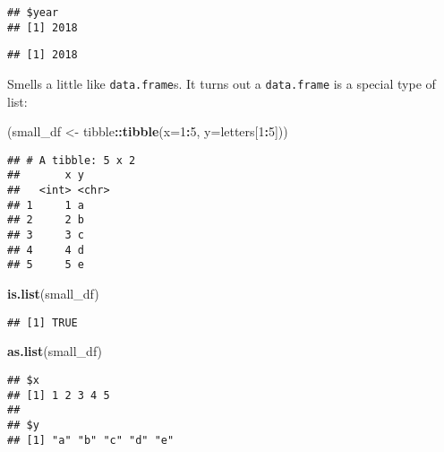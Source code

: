 \documentclass[]{article}
\newenvironment{Shaded}{\begin{snugshade}}{\end{snugshade}}
\newcommand{\KeywordTok}[1]{\textcolor[rgb]{0.13,0.29,0.53}{\textbf{#1}}}
\newcommand{\DataTypeTok}[1]{\textcolor[rgb]{0.13,0.29,0.53}{#1}}
\newcommand{\DecValTok}[1]{\textcolor[rgb]{0.00,0.00,0.81}{#1}}
\newcommand{\StringTok}[1]{\textcolor[rgb]{0.31,0.60,0.02}{#1}}
\newcommand{\OperatorTok}[1]{\textcolor[rgb]{0.81,0.36,0.00}{\textbf{#1}}}
\newcommand{\NormalTok}[1]{#1}
\begin{document}
\begin{verbatim}
## $year
## [1] 2018
\end{verbatim}

\begin{Shaded}
\end{Shaded}

\begin{verbatim}
## [1] 2018
\end{verbatim}

Smells a little like \texttt{data.frame}s. It turns out a
\texttt{data.frame} is a special type of list:

\begin{Shaded}
\begin{Highlighting}[]
\NormalTok{(small_df <-}\StringTok{ }\NormalTok{tibble}\OperatorTok{::}\KeywordTok{tibble}\NormalTok{(}\DataTypeTok{x=}\DecValTok{1}\OperatorTok{:}\DecValTok{5}\NormalTok{, }\DataTypeTok{y=}\NormalTok{letters[}\DecValTok{1}\OperatorTok{:}\DecValTok{5}\NormalTok{]))}
\end{Highlighting}
\end{Shaded}

\begin{verbatim}
## # A tibble: 5 x 2
##       x y    
##   <int> <chr>
## 1     1 a    
## 2     2 b    
## 3     3 c    
## 4     4 d    
## 5     5 e
\end{verbatim}

\begin{Shaded}
\begin{Highlighting}[]
\KeywordTok{is.list}\NormalTok{(small_df)}
\end{Highlighting}
\end{Shaded}

\begin{verbatim}
## [1] TRUE
\end{verbatim}

\begin{Shaded}
\begin{Highlighting}[]
\KeywordTok{as.list}\NormalTok{(small_df)}
\end{Highlighting}
\end{Shaded}

\begin{verbatim}
## $x
## [1] 1 2 3 4 5
## 
## $y
## [1] "a" "b" "c" "d" "e"
\end{verbatim}
\end{document}
